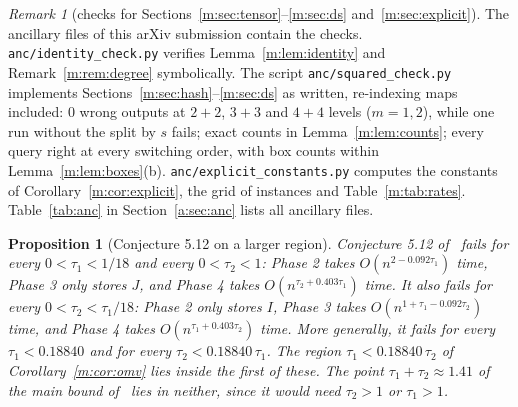 \documentclass[11pt]{article}
\newtheorem{proposition}[theorem]{Proposition}
\theoremstyle{definition}
\theoremstyle{remark}
\newtheorem{remark}[theorem]{Remark}
\newcommand{\HintedOMvRfourteen}{0.18840}%
\begin{document}
\begin{remark}[checks for Sections~\ref{m:sec:tensor}--\ref{m:sec:ds} and~\ref{m:sec:explicit}]\label{m:rem:brute}
The ancillary files of this arXiv submission contain the checks. \texttt{anc/identity\_check.py} verifies Lemma~\ref{m:lem:identity} and Remark~\ref{m:rem:degree} symbolically. The script \texttt{anc/squared\_check.py} implements Sections~\ref{m:sec:hash}--\ref{m:sec:ds} as written, re-indexing maps included: $0$ wrong outputs at $2+2$, $3+3$ and $4+4$ levels ($m=1,2$), while one run without the split by $s$ fails; exact counts in Lemma~\ref{m:lem:counts}; every query right at every switching order, with box counts within Lemma~\ref{m:lem:boxes}(b). \texttt{anc/explicit\_constants.py} computes the constants of Corollary~\ref{m:cor:explicit}, the grid of instances and Table~\ref{m:tab:rates}. Table~\ref{tab:anc} in Section~\ref{a:sec:anc} lists all ancillary files.
\end{remark}

\begin{proposition}[Conjecture 5.12 on a larger region]\label{m:rem:omv512}
Conjecture 5.12 of~\cite{BNS19} fails for every $0<\tau_1<1/18$ and every $0<\tau_2<1$: Phase 2 takes $O(n^{2-0.092\tau_1})$ time, Phase 3 only stores $J$, and Phase 4 takes $O(n^{\tau_2+0.403\tau_1})$ time. It also fails for every $0<\tau_2<\tau_1/18$: Phase 2 only stores $I$, Phase 3 takes $O(n^{1+\tau_1-0.092\tau_2})$ time, and Phase 4 takes $O(n^{\tau_1+0.403\tau_2})$ time. More generally, it fails for every $\tau_1<\HintedOMvRfourteen$ and for every $\tau_2<\HintedOMvRfourteen\,\tau_1$. The region $\tau_1<\HintedOMvRfourteen\,\tau_2$ of Corollary~\ref{m:cor:omv} lies inside the first of these. The point $\tau_1+\tau_2\approx1.41$ of the main bound of~\cite{BNS19} lies in neither, since it would need $\tau_2>1$ or $\tau_1>1$.
\end{proposition}
\end{document}
